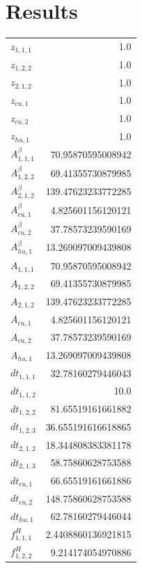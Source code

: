 \documentclass{article}%
\makeatletter
\let\mcnewpage=\newpage%
\newcommand{\TrickSupertabularIntoMulticols}{%
\renewcommand\newpage{%
\if@firstcolumn%
\hrule width\linewidth height0pt%
\columnbreak%
\else%
\mcnewpage%
\fi%
}%
}%
\makeatother
\begin{document}
\section{Results}%
\thispagestyle{plain}%
\begin{multicols*}{3}%
\TrickSupertabularIntoMulticols%
%
\begin{supertabular}{lr}%
	$z_{1,1,1}$ & 1.0 \\%
	$z_{1,2,2}$ & 1.0 \\%
	$z_{2,1,2}$ & 1.0 \\%
	$z_{cu,1}$ & 1.0 \\%
	$z_{cu,2}$ & 1.0 \\%
	$z_{hu,1}$ & 1.0 \\%
	$A_{1,1,1}^{\beta}$ & 70.95870595008942 \\%
	$A_{1,2,2}^{\beta}$ & 69.41355730879985 \\%
	$A_{2,1,2}^{\beta}$ & 139.47623233772285 \\%
	$A_{cu,1}^{\beta}$ & 4.825601156120121 \\%
	$A_{cu,2}^{\beta}$ & 37.78573239590169 \\%
	$A_{hu,1}^{\beta}$ & 13.269097009439808 \\%
	$A_{1,1,1}$ & 70.95870595008942 \\%
	$A_{1,2,2}$ & 69.41355730879985 \\%
	$A_{2,1,2}$ & 139.47623233772285 \\%
	$A_{cu,1}$ & 4.825601156120121 \\%
	$A_{cu,2}$ & 37.78573239590169 \\%
	$A_{hu,1}$ & 13.269097009439808 \\%
	$dt_{1,1,1}$ & 32.78160279446043 \\%
	$dt_{1,1,2}$ & 10.0 \\%
	$dt_{1,2,2}$ & 81.65519161661882 \\%
	$dt_{1,2,3}$ & 36.655191616618865 \\%
	$dt_{2,1,2}$ & 18.344808383381178 \\%
	$dt_{2,1,3}$ & 58.75860628753588 \\%
	$dt_{cu,1}$ & 66.65519161661886 \\%
	$dt_{cu,2}$ & 148.75860628753588 \\%
	$dt_{hu,1}$ & 62.78160279446044 \\%
	$f_{1,1,1}^{H}$ & 2.4408860136921815 \\%
	$f_{1,2,2}^{H}$ & 9.214174054970886 \\%

\end{supertabular}
\end{multicols*}
\end{document}
